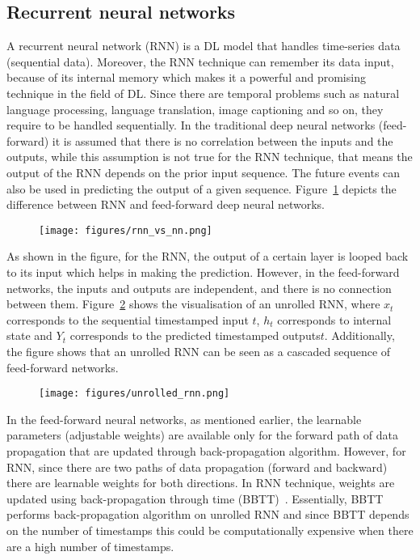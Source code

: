 \subsection{Recurrent neural networks}
A recurrent neural network (RNN) is a DL model that handles time-series data (sequential data).
Moreover, the RNN technique can remember its data input, because of its internal memory which makes it a powerful and promising technique in the field of DL.
Since there are temporal problems such as natural language processing, language translation, image captioning and so on, they require to be handled sequentially.
In the traditional deep neural networks (feed-forward) it is assumed that there is no correlation between the inputs and the outputs, while this assumption is not true for the RNN technique, that means the output of the RNN depends on the prior input sequence.
The future events can also be used in predicting the output of a given sequence.
Figure~\ref{rnn_vs_nn} depicts the difference between RNN and feed-forward deep neural networks.
\begin{figure}
	\begin{center}
		\texttt{[image: figures/rnn\_vs\_nn.png]}
	\end{center}
	\label{rnn_vs_nn}
\end{figure}
As shown in the figure, for the RNN, the output of a certain layer is looped back to its input which helps in making the prediction.
However, in the feed-forward networks, the inputs and outputs are independent, and there is no connection between them.
Figure~\ref{unrolled_rnn} shows the visualisation of an unrolled RNN, where \(x_{t}\) corresponds to the sequential timestamped input \(t\), \(h_{t}\) corresponds to internal state  and \(Y_{t}\) corresponds to the predicted timestamped outputs\(t\).
Additionally, the figure shows that an unrolled RNN can be seen as a cascaded sequence of feed-forward networks.
\begin{figure}
	\begin{center}
		\texttt{[image: figures/unrolled\_rnn.png]}
	\end{center}
	\label{unrolled_rnn}
\end{figure}
In the feed-forward neural networks, as mentioned earlier, the learnable parameters (adjustable weights) are available only for the forward path of data propagation that are updated through back-propagation algorithm.
However, for RNN, since there are two paths of data propagation (forward and backward) there are learnable weights for both directions.
In RNN technique, weights are updated using back-propagation through time (BBTT)~\cite{Werbos1990}.
Essentially, BBTT performs back-propagation algorithm on unrolled RNN and since BBTT depends on the number of timestamps this could be computationally expensive when there are a high number of timestamps.


